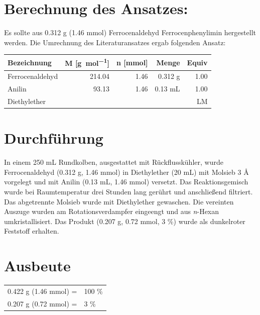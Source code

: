 \documentclass[12pt]{article}
\begin{document}
\begin{onehalfspace}

\section{Berechnung des Ansatzes: }
Es sollte aus 0.312 g (1.46 \si{\milli\mol}) Ferrocenaldehyd Ferrocenphenylimin hergestellt werden.
Die Umrechnung des Literaturansatzes\cite{durch} ergab folgenden Ansatz:\\[0.5cm]
\begin{tabularx}{\textwidth}{lrrrr}
\toprule
\textbf{Bezeichnung}&\textbf{ M [\si{\gram\per\mol}]} & \textbf{n [\si{\milli\mol}]} & \textbf{Menge} & \textbf{Equiv}\\
\midrule
Ferrocenaldehyd & 214.04 & 1.46  &  0.312 \si{\gram} &1.00   \\
Anilin          & 93.13  & 1.46  &  0.13 \si{\milli\liter} & 1.00  \\
Diethylether    &  &  &  & LM   \\
\bottomrule
\end{tabularx}


\normalsize \section{Durchführung \cite{durch}}
In einem 250 \si{\milli\liter} Rundkolben, ausgestattet mit Rückflusskühler, wurde Ferrocenaldehyd (0.312 g, 1.46 \si{\milli\mol}) in Diethylether (20 \si{\milli\liter}) mit Molsieb 3 \si{\angstrom} vorgelegt und mit Anilin (0.13 \si{\milli\liter}, 1.46 \si{\milli\mol}) versetzt. Das Reaktionsgemisch wurde bei Raumtemperatur drei Stunden lang gerührt und anschließend filtriert. Das abgetrennte Molsieb wurde mit Diethylether gewaschen. Die vereinten Auszuge wurden am Rotationsverdampfer eingeengt und aus \textit{n}-Hexan umkristallisiert. Das Produkt (0.207 \si{\gram}, 0.72 \si{\milli\mol}, 3 \%) wurde als dunkelroter Feststoff erhalten.

\section{Ausbeute}
\begin{tabular}{ll}
  0.422 \si{\gram} (1.46 \si{\milli\mol}) =  & 100 \%\\
  0.207 \si{\gram} (0.72 \si{\milli\mol}) =  & 3 \%  \\
\end{tabular}

\end{onehalfspace}
\end{document}
